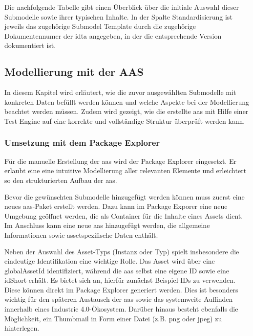 Die nachfolgende Tabelle gibt einen Überblick über die initiale Auswahl dieser Submodelle sowie ihrer typischen Inhalte.
In der Spalte Standardisierung ist jeweils das zugehörige Submodel Template durch die zugehörige Dokumentennumer der \acs{idta} angegeben, in der die entsprechende Version dokumentiert ist.







\newpage
\subsection{Modellierung mit der AAS}
In diesem Kapitel wird erläutert, wie die zuvor ausgewählten Submodelle mit konkreten Daten befüllt werden können und welche Aspekte bei der Modellierung beachtet werden müssen.
Zudem wird gezeigt, wie die erstellte \acs{aas} mit Hilfe einer Test Engine auf eine korrekte und vollständige Struktur überprüft werden kann. 
\subsubsection{Umsetzung mit dem Package Explorer}
Für die manuelle Erstellung der \acs{aas} wird der Package Explorer eingesetzt.
Er erlaubt eine eine intuitive Modellierung aller relevanten Elemente und erleichtert so den strukturierten Aufbau der \acs{aas}.

Bevor die gewünschten Submodelle hinzugefügt werden können muss zuerst eine neues \acs{aas}-Paket erstellt werden.
Dazu kann im Package Exporer eine neue Umgebung geöffnet werden, die als Container für die Inhalte eines Assets dient.
Im Anschluss kann eine neue \acs{aas} hinzugefügt werden, die allgemeine Informationen sowie assetspezifische Daten enthält.

Neben der Auswahl des Asset-Typs (Instanz oder Typ) spielt insbesondere die eindeutige Identifikation eine wichtige Rolle.
Das Asset wird über eine globalAssetId identifiziert, während die \acs{aas} selbst eine eigene ID sowie eine idShort erhält.
Es bietet sich an, hierfür zunächst Beispiel-IDs zu verwenden. Diese können direkt im Package Explorer generiert werden.
Dies ist besonders wichtig für den späteren Austausch der \acs{aas} sowie das systemweite Auffinden innerhalb eines Industrie 4.0-Ökosystem.
Darüber hinaus besteht ebenfalls die Möglichkeit, ein Thumbmail in Form einer Datei (z.B. png oder jpeg) zu hinterlegen.

